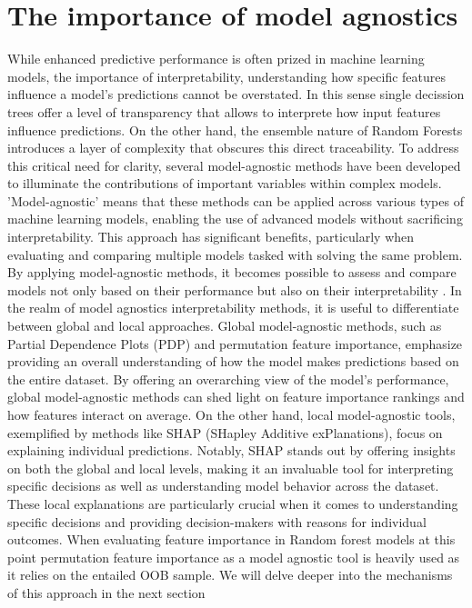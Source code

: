\documentclass[12pt]{article}
\begin{document}
\section{The importance of model agnostics}
While enhanced predictive performance is often prized in machine learning models, the importance of interpretability, understanding how specific features influence a model's predictions cannot be overstated. 
In this sense single decission trees offer a level of transparency that allows to interprete how input features influence predictions. 
On the other hand, the ensemble nature of Random Forests introduces a layer of complexity that obscures this direct traceability.
To address this critical need for clarity, several model-agnostic methods have been developed to illuminate the contributions of important variables within complex models.
'Model-agnostic' means that these methods can be applied across various types of machine learning models, enabling the use of advanced models without sacrificing interpretability. 
This approach has significant benefits, particularly when evaluating and comparing multiple models tasked with solving the same problem. By applying model-agnostic methods, it becomes possible to assess and compare models not only based on their performance but also on their interpretability \cite{molnar2022}.
In the realm of model agnostics interpretability methods, it is useful to differentiate between global and local approaches. 
 Global model-agnostic methods, such as Partial Dependence Plots (PDP) and permutation feature importance, emphasize providing an overall understanding of how the model makes predictions based on the entire dataset.
 By offering an overarching view of the model's performance, global model-agnostic methods can shed light on feature importance rankings and how features interact on average.
 On the other hand, local model-agnostic tools, exemplified by methods like SHAP (SHapley Additive exPlanations), focus on explaining individual predictions. Notably, SHAP stands out by offering insights on both the global and local levels, making it an invaluable tool for interpreting specific decisions as well as understanding model behavior across the dataset. These local explanations are particularly crucial when it comes to understanding specific decisions and providing decision-makers with reasons for individual outcomes.
When evaluating feature importance in Random forest models at this point permutation feature importance as a model agnostic tool is heavily used as it relies on the entailed OOB sample. We will delve deeper into the mechanisms of this approach in the next section
\end{document}
